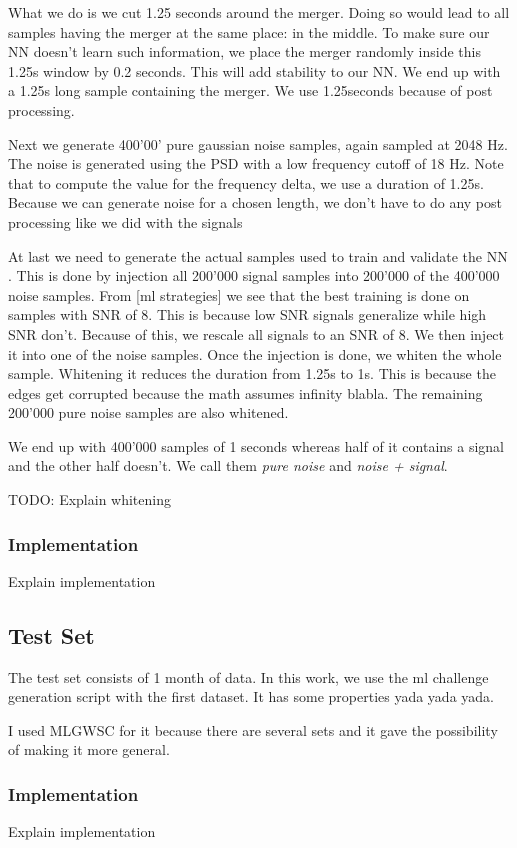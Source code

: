  What we do is we cut 1.25 seconds around the merger. Doing so would lead to
 all samples having the merger at the same place: in the middle. To make sure
 our NN doesn't learn such information, we place the merger randomly inside this
 1.25s window by 0.2 seconds. This will add stability to our NN. We end up with
 a 1.25s long sample containing the merger. We use 1.25seconds because of post
 processing.

Next we generate 400'00' pure gaussian noise samples, again sampled at 2048 Hz.
The noise is generated using the 
PSD with
a low frequency cutoff of 18 Hz. Note that to compute the value for the
frequency delta, we use a duration of 1.25s. Because we can generate noise for
a chosen length, we don't have to do any post processing like we did with the
signals


At last we need to generate the actual samples used to train and validate the NN
. This is done by injection all 200'000 signal samples into 200'000 of the
400'000 noise samples. From [ml strategies] we see that the best training is
done on samples with SNR of 8. This is because low SNR signals generalize while
high SNR don't. Because of this, we rescale all signals to an SNR of 8. We then
inject it into one of the noise samples. Once the injection is done, we whiten
the whole sample. Whitening it reduces the duration from 1.25s to 1s. This is
because the edges get corrupted because the math assumes infinity blabla. The
remaining 200'000 pure noise samples are also whitened.

We end up with 400'000 samples of 1 seconds whereas half of it contains a signal
and the other half doesn't. We call them \textit{pure noise} and 
\textit{noise + signal}.

TODO: Explain whitening

\subsubsection{Implementation}
Explain implementation

\subsection{Test Set}
The test set consists of 1 month of data. In this work, we use the ml challenge
generation script with the first dataset. It has some properties yada yada yada.

I used MLGWSC for it because there are several sets and it gave the possibility
of making it more general. 

\subsubsection{Implementation}
Explain implementation

